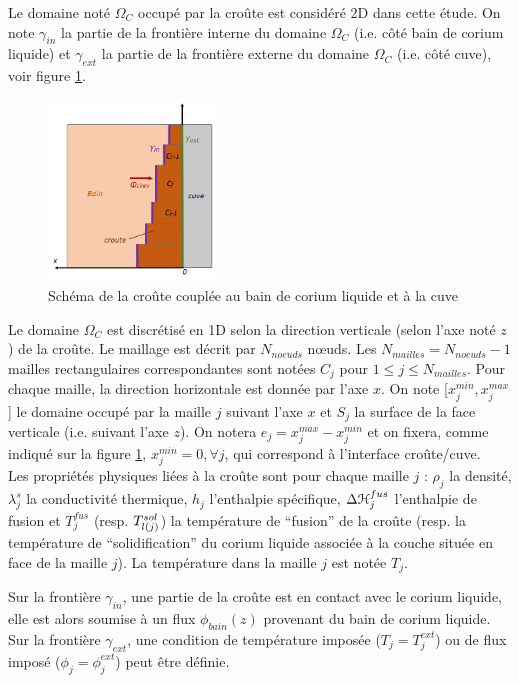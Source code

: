 Le domaine noté $\Omega_C$ occupé par la croûte est considéré 2D dans cette étude. On note $\gamma_{in}$ la partie de la frontière interne du domaine $\Omega_C$ (i.e. côté bain de corium liquide) et $\gamma_{ext}$ la partie de la frontière externe du domaine $\Omega_C$ (i.e. côté cuve), voir figure \ref{fig:crust_figure}. 

\begin{figure}[H]
\centering
\includegraphics[width=0.4\textwidth]{Figures/crust_figure.png}
\caption{Schéma de la croûte couplée au bain de corium liquide et à la cuve} \label{fig:crust_figure}
\end{figure}

Le domaine $\Omega_C$ est discrétisé en 1D selon la direction verticale (selon l'axe noté $z$) de la croûte. Le maillage est décrit par $N_{noeuds}$ n\oe{}uds. Les $N_{mailles}=N_{noeuds}-1$ mailles rectangulaires correspondantes sont notées $C_j$ pour $1 \leq j\leq N_{mailles}$. Pour chaque maille, la direction horizontale est donnée par l'axe $x$. On note [$x_j^{min}, x_j^{max}$] le domaine occupé par la maille $j$ suivant l'axe $x$ et $S_j$ la surface de la face verticale (i.e. suivant l'axe $z$). On notera $e_j=x_j^{max}-x_j^{min}$ et on fixera, comme indiqué sur la figure \ref{fig:crust_figure}, $x_j^{min}=0,\forall j$, qui correspond à l'interface croûte/cuve.\\

Les propriétés physiques liées à la croûte sont pour chaque maille $j$ : $\rho_j$ la densité, $\lambda^s_j$ la conductivité thermique, $h_j$ l'enthalpie spécifique, $\Delta {\cal H}_j^{fus}$ l'enthalpie de fusion et $T_j^{fus}$ (resp. $\temperature[sol]{l(j)}$) la température de ``fusion'' de la croûte (resp. la température de ``solidification'' du corium liquide associée à la couche située en face de la maille $j$). La température dans la maille $j$ est notée $T_j$.

Sur la frontière $\gamma_{in}$, une partie de la croûte est en contact avec le corium liquide, elle est alors soumise à un flux $\phi_{bain}(z)$ provenant du bain de corium liquide. Sur la frontière $\gamma_{ext}$, une condition de température imposée ($T_j=T_j^{ext}$) ou de flux imposé ($\phi_j=\phi_j^{ext}$) peut être définie.\\
 
